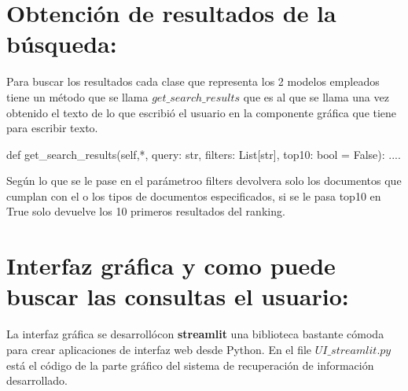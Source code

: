 \documentclass{llncs}
\begin{document}
\section{Obtención de resultados de la búsqueda:}

Para buscar los resultados cada clase que representa los 2 modelos empleados tiene un 
método que se llama $get\_search\_results$ que es al que se llama una vez obtenido el texto 
de lo que escribió el usuario en la componente gráfica que tiene para escribir texto.

\begin{python}
def get_search_results(self,*, query: str,
    filters: List[str],
    top10: bool = False):
    ....
\end{python}

Según lo que se le pase en el parámetroo filters devolvera solo los documentos que cumplan 
con el  o los tipos de documentos  especificados, si se le pasa top10 en True solo 
devuelve los 10 primeros resultados del ranking.




\section{Interfaz gráfica y como puede buscar las consultas el usuario:}

La interfaz gráfica se desarrollócon \textbf{streamlit} una biblioteca bastante cómoda para 
crear aplicaciones de interfaz web desde Python. En el file $UI\_streamlit.py$ 
está el código de la parte gráfico del sistema de recuperación de información 
desarrollado.
\end{document}
